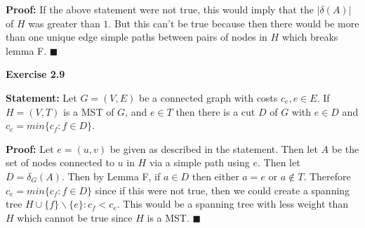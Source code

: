 \documentclass{article}
\newcommand*{\QEDA}{\hfill\ensuremath{\blacksquare}}%
\begin{document}
\textbf{Proof:} If the above statement were not true, this would imply that the $|\delta(A)|$ of $H$ was greater than $1$. But this can't be true because then there would be more than one unique edge simple paths between pairs of nodes in $H$ which breaks lemma F.
\QEDA

\textbf{Exercise 2.9}

\textbf{Statement:} Let $G = (V,E)$ be a connected graph with costs $c_e, e \in E$. If $H = (V,T)$ is a MST of $G$, and $e \in T$ then there is a cut $D$ of $G$ with $e \in D$ and $c_e = min\{c_f : f \in D\}$.

\textbf{Proof:} Let $e = (u,v)$ be given as described in the statement. Then let $A$ be the set of nodes connected to $u$ in $H$ via a simple path using $e$. Then let $D = \delta_G(A)$. Then by Lemma F, if $a \in D$ then either $a = e$ or $a \notin T$. Therefore 
$c_e = min\{c_f : f \in D\}$ since if this were not true, then we could create a spanning tree $H \cup \{f\} \backslash \{e\} : c_f < c_e$. This would be a spanning tree with less weight than $H$ which cannot be true since $H$ is a MST.
\QEDA
 
\end{document}
